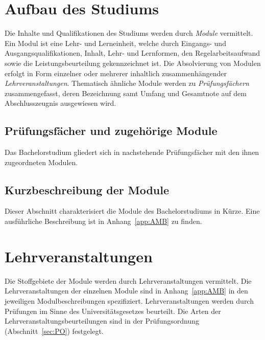 %

\section{Aufbau des Studiums}\label{sec:AS}

Die Inhalte und Qualifikationen des Studiums werden durch
\emph{Module} vermittelt. Ein Modul ist eine Lehr- und Lerneinheit,
welche durch Eingangs- und Ausgangsqualifikationen, Inhalt, Lehr- und
Lernformen, den Regelarbeitsaufwand sowie die Leistungsbeurteilung
gekennzeichnet ist. Die Absolvierung von Modulen erfolgt in Form
einzelner oder mehrerer inhaltlich zusammenhängender
\emph{Lehrveranstaltungen}.  Thematisch ähnliche Module werden zu
\emph{Prüfungsfächern} zusammengefasst, deren Bezeichnung samt Umfang
und Gesamtnote auf dem Abschlusszeugnis ausgewiesen wird.

\subsection*{Prüfungsfächer und zugehörige Module}

Das Bachelorstudium \emph{} gliedert sich in
nachstehende Prüfungsfächer mit den ihnen zugeordneten Modulen.
%

\subsection*{Kurzbeschreibung der Module}

Dieser Abschnitt charakterisiert die Module des Bachelorstudiums
\emph{} in Kürze. Eine ausführliche Beschreibung ist in
Anhang~\ref{app:AMB} zu finden.

%

\section{Lehrveranstaltungen}\label{sec:LVS}

Die Stoffgebiete der Module werden durch Lehrveranstaltungen
vermittelt. Die Lehrveranstaltungen der einzelnen Module sind in
Anhang~\ref{app:AMB} in den jeweiligen Modulbeschreibungen
spezifiziert.  Lehrveranstaltungen werden durch Prüfungen im Sinne des
Universitätsgesetzes beurteilt.  Die Arten der
Lehrveranstaltungsbeurteilungen sind in der Prüfungsordnung
(Abschnitt~\ref{sec:PO}) festgelegt.

